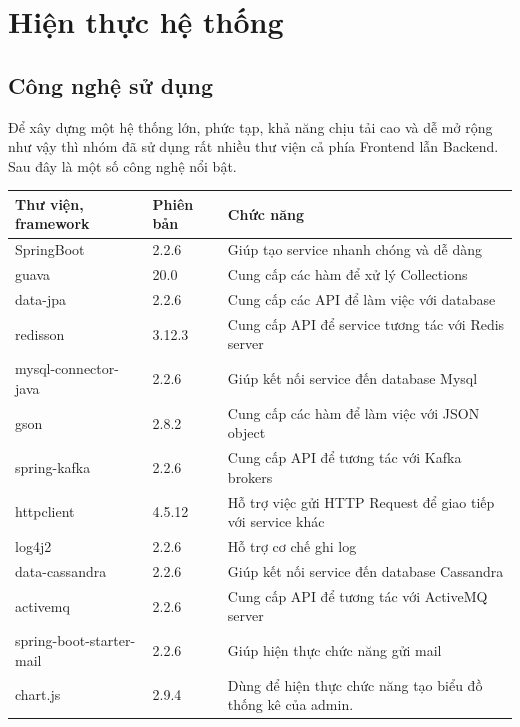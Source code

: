 \chapter{Hiện thực hệ thống}

\section{Công nghệ sử dụng}

	Để xây dựng một hệ thống lớn, phức tạp, khả năng chịu tải cao và dễ mở rộng như vậy thì nhóm đã sử dụng rất nhiều thư viện cả phía Frontend lẫn Backend. Sau đây là một số công nghệ nổi bật.
	
	\newpage
	
	\begin{table}[!htp]
		\centering\begin{tabular}{|l|l|m{20em}|}
			\hline 
			\textbf{Thư viện, framework} & \textbf{Phiên bản} & \textbf{Chức năng}\\
			\hline 
			SpringBoot & 2.2.6 & Giúp tạo service nhanh chóng và dễ dàng  \\
			\hline 
			guava & 20.0 & Cung cấp các hàm để xử lý Collections \\
			\hline 
			data-jpa & 2.2.6 & Cung cấp các API để làm việc với database \\
			\hline 
			redisson & 3.12.3 & Cung cấp API để service tương tác với Redis server\\
			\hline 
			mysql-connector-java & 2.2.6 & Giúp kết nối service đến database Mysql \\
			\hline 
			gson & 2.8.2 & Cung cấp các hàm để làm việc với JSON object \\
			\hline 
			spring-kafka &  2.2.6 & Cung cấp API để tương tác với Kafka brokers \\
			\hline 
			httpclient & 4.5.12 & Hỗ trợ việc gửi HTTP Request để giao tiếp với service khác \\
			\hline 
			log4j2 &  2.2.6 & Hỗ trợ cơ chế ghi log \\
			\hline 
			data-cassandra & 2.2.6 & Giúp kết nối service đến database Cassandra \\
			\hline 
			activemq & 2.2.6  & Cung cấp API để tương tác với ActiveMQ server \\
			\hline 
			spring-boot-starter-mail & 2.2.6 & Giúp hiện thực chức năng gửi mail \\
			\hline
			chart.js & 2.9.4 & Dùng để hiện thực chức năng tạo biểu đồ thống kê của admin. \\

\end{tabular}
\end{table}
